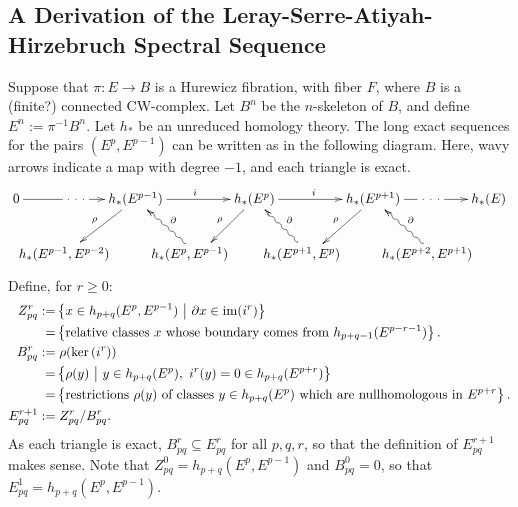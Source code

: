 \documentclass[11pt]{article}
\newcommand{\myheading}[1]
{{\noindent\Large #1}

}
\newcommand{\shrt}[1]{\makebox[0cm]{\ensuremath{#1}}}
\renewcommand{\myheading}[1]{\subsection{#1}}
\begin{document}
\myheading{A Derivation of the Leray-Serre-Atiyah-Hirzebruch Spectral Sequence}
\begin{Leray Serre Hirzebruch SS}
Suppose that $\pi:E\to B$ is a Hurewicz fibration, with fiber $F$, where $B$ is a (finite?) connected CW-complex. Let $B^n$ be the $n$-skeleton of $B$, and define $E^n:=\pi^{-1}B^n$. Let $h_*$ be an unreduced homology theory. The long exact sequences for the pairs $(E^p,E^{p-1})$ can be written as in the following diagram. Here, wavy arrows indicate a map with degree $-1$, and each triangle is exact.
\[\xymatrix@C=.5cm{
0\ar[rr]|{\ \cdot\ \cdot\ \cdot\ }&&h_*(E^{p-1})\ar[rr]^i\ar[ld]_\rho &&h_*(E^{p})\ar[rr]^i \ar[ld]_\rho&&h_*(E^{p+1})\ar[ld]_\rho
\ar[rr]|{\ \cdot\ \cdot\ \cdot\ }&&h_*(E)\\
&\ \ \ \ \shrt{h_*(E^{p-1},E^{p-2})}\phantom{\binom{5}{3}}&&
\shrt{h_*(E^{p},E^{p-1})}\phantom{\binom{5}{3}}\ar@{~>}[lu]_\partial&&
\shrt{h_*(E^{p+1},E^{p})}\phantom{\binom{5}{3}}\ar@{~>}[lu]_\partial&&
\shrt{h_*(E^{p+2},E^{p+1})}\phantom{\binom{5}{3}}\ar@{~>}[lu]_\partial
}\]
Define, for $r\geq0$:
\begin{alignat*}{2}
Z_{pq}^r:=&\left\{x\in h_{p+q}(E^p,E^{p-1})\ \middle|\ \partial x\in\im(i^{r})\right\}\\
=&\left\{\text{relative classes $x$ whose boundary comes from $h_{p+q-1}(E^{p-r-1})$}\right\}.\\
B_{pq}^r:=&\left.\rho(\ker(i^r))\right.\\
=&\left\{\rho(y)\ \middle|\ y\in h_{p+q}(E^p),\ i^r(y)=0\in h_{p+q}(E^{p+r})\right\}\\
=&\left\{\text{restrictions $\rho(y)$ of classes $y\in h_{p+q}(E^p)$ which are nullhomologous in $E^{p+r}$}\right\}.\\
E_{pq}^{r+1}:=&\left.Z_{pq}^r/B_{pq}^r.\right.%
\end{alignat*}
As each triangle is exact, $B_{pq}^r\subseteq E_{pq}^r$ for all $p,q,r$, so that the definition of $E_{pq}^{r+1}$ makes sense.
Note that $Z_{pq}^0=h_{p+q}(E^p,E^{p-1})$ and $B_{pq}^0=0$, so that $E_{pq}^1=h_{p+q}(E^p,E^{p-1})$.


\end{Leray Serre Hirzebruch SS}
\end{document}
